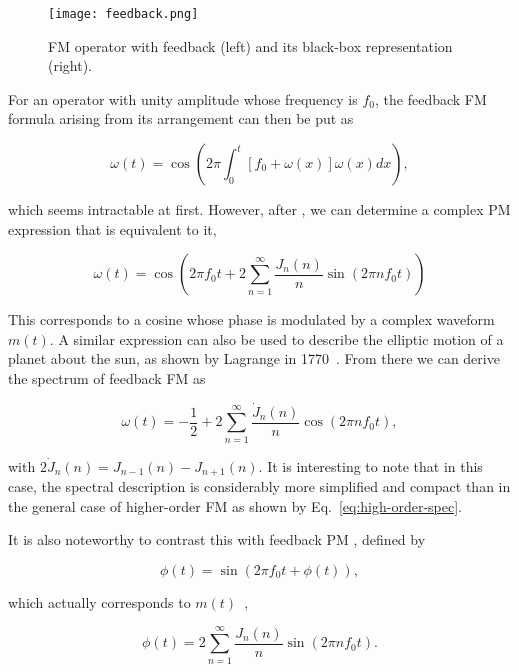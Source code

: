 \documentclass[]{interact}
\begin{document}
\begin{figure}[htp]
\begin{center}
\texttt{[image: feedback.png]}
\caption{FM operator with feedback (left) and its black-box representation (right).}
\label{fig:feedback}
\end{center}
\end{figure} 

For an operator with unity amplitude whose frequency is $f_0$, the feedback FM formula arising from 
its arrangement can then be put as

\begin{equation}
\omega(t) = \cos\left(2\pi \int_0^t [f_0 + \omega(x)]\omega(x) dx\right),
\end{equation}

\noindent which seems intractable at first. However, after \cite{Mitsuhashi}, we can determine 
a complex PM expression that is equivalent to it,

\begin{equation}
\omega(t) = \cos\left(2\pi f_0 t + 2 \sum_{n=1}^{\infty} \frac {J_{n}(n)} n \sin(2\pi n f_0 t)\right) 
\end{equation}

\noindent This corresponds to a cosine whose phase is modulated by a complex
waveform $m(t)$. A similar expression can also be used to 
describe the elliptic motion of a planet about the sun, as shown by 
Lagrange in 1770~\citep[p.6]{Watson}. From there we can derive the spectrum of feedback FM as 

\begin{equation}
\omega(t) = -\frac 1 2 + 2 \sum_{n=1}^{\infty} \frac{\dot{J}_n(n)} n  \cos(2\pi n f_0 t),
\end{equation}

\noindent with $2\dot{J}_n(n) = J_{n-1}(n) - J_{n+1}(n)$. It is interesting to note that in this
case, the spectral description is considerably more simplified and compact than in the
general case of higher-order FM as shown by Eq.~\ref{eq:high-order-spec}.

It is also noteworthy to contrast this with feedback PM \citep{Tomisawa}, defined by

\begin{equation}
\phi(t) = \sin\left(2\pi f_0 t + \phi(t)\right),
\end{equation}

\noindent which actually corresponds to $m(t)$~\citep[p.62]{Benson},

\begin{equation}
\phi(t) = 2 \sum_{n=1}^{\infty} \frac {J_{n}(n)} n \sin(2\pi n f_0 t).
\end{equation}
\end{document}
